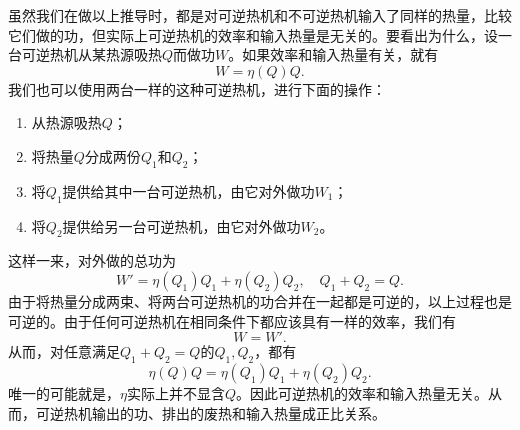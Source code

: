 \documentclass[hyperref, UTF8, a4paper]{ctexart}
\begin{document}
虽然我们在做以上推导时，都是对可逆热机和不可逆热机输入了同样的热量，比较它们做的功，但实际上可逆热机的效率和输入热量是无关的。要看出为什么，设一台可逆热机从某热源吸热$Q$而做功$W$。如果效率和输入热量有关，就有
\[
    W = \eta(Q) Q.
\]
我们也可以使用两台一样的这种可逆热机，进行下面的操作：
\begin{enumerate}
    \item 从热源吸热$Q$；
    \item 将热量$Q$分成两份$Q_1$和$Q_2$；
    \item 将$Q_1$提供给其中一台可逆热机，由它对外做功$W_1$；
    \item 将$Q_2$提供给另一台可逆热机，由它对外做功$W_2$。
\end{enumerate}
这样一来，对外做的总功为
\[
    W' = \eta(Q_1) Q_1 + \eta(Q_2) Q_2, \quad Q_1 + Q_2 = Q.
\]
由于将热量分成两束、将两台可逆热机的功合并在一起都是可逆的，以上过程也是可逆的。由于任何可逆热机在相同条件下都应该具有一样的效率，我们有
\[
    W = W'.
\]
从而，对任意满足$Q_1 + Q_2 = Q$的$Q_1, Q_2$，都有
\[
    \eta(Q) Q = \eta(Q_1) Q_1 + \eta(Q_2) Q_2.
\]
唯一的可能就是，$\eta$实际上并不显含$Q$。因此可逆热机的效率和输入热量无关。从而，可逆热机输出的功、排出的废热和输入热量成正比关系。
\end{document}

